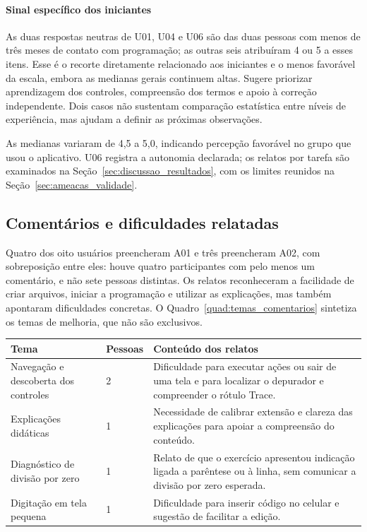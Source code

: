 \documentclass[
    12pt
    ,oneside
    ,a4paper
    ,chapter=TITLE
    ,section=TITLE
    ,sumario=abnt-6027-2012]{abntex2}
\renewcommand{\legenda}[2][]{%
    \centering
    \caption[\MakeTextUppercase{#2}]{\maybeLabel{#1}\MakeTextUppercase{#2}}%
}
\begin{document}
\paragraph*{Sinal específico dos iniciantes}
As duas respostas neutras de U01, U04 e U06 são das duas pessoas com menos de três meses de contato com programação; as outras seis atribuíram 4 ou 5 a esses itens. Esse é o
recorte diretamente relacionado aos iniciantes e o menos favorável da escala,
embora as medianas gerais continuem altas. Sugere priorizar aprendizagem dos
controles, compreensão dos termos e apoio à correção independente. Dois casos não
sustentam comparação estatística entre níveis de experiência, mas ajudam a definir
as próximas observações.

As medianas variaram de 4,5 a 5,0, indicando percepção favorável no grupo que usou o
aplicativo. U06 registra a autonomia declarada; os relatos por tarefa são examinados
na Seção~\ref{sec:discussao_resultados}, com os limites reunidos na
Seção~\ref{sec:ameacas_validade}.

\subsection{Comentários e dificuldades relatadas}
\label{sec:comentarios_resultados}

Quatro dos oito usuários preencheram A01 e três preencheram A02, com sobreposição entre
eles: houve quatro participantes com pelo menos um comentário, e não sete pessoas
distintas. Os relatos reconheceram a facilidade de criar arquivos, iniciar a programação
e utilizar as explicações, mas também apontaram dificuldades concretas. O
Quadro~\ref{quad:temas_comentarios} sintetiza os temas de melhoria, que não são exclusivos.

\begin{quadro}[htb]
\centering
\legenda[quad:temas_comentarios]{Temas de melhoria presentes nos comentários de quatro usuários}
\small
\begin{tabular}{|p{3.5cm}|p{1.6cm}|p{7.9cm}|}
\hline
Tema & Pessoas & Conteúdo dos relatos \\
\hline\hline
Navegação e descoberta dos controles & 2 & Dificuldade para executar ações ou sair de uma tela e para localizar o depurador e compreender o rótulo Trace. \\
\hline
Explicações didáticas & 1 & Necessidade de calibrar extensão e clareza das explicações para apoiar a compreensão do conteúdo. \\
\hline
Diagnóstico de divisão por zero & 1 & Relato de que o exercício apresentou indicação ligada a parêntese ou à linha, sem comunicar a divisão por zero esperada. \\
\hline
Digitação em tela pequena & 1 & Dificuldade para inserir código no celular e sugestão de facilitar a edição. \\
\hline
\end{tabular}
\vspace{0.2cm}
\end{quadro}
\FloatBarrier
\end{document}
